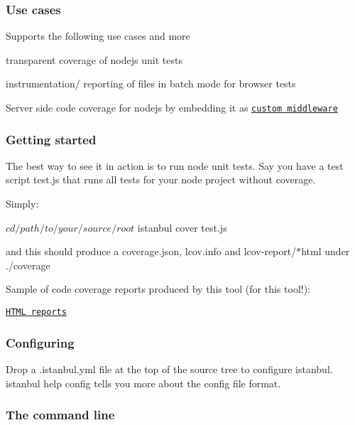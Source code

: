 \subsubsection*{Use cases}

Supports the following use cases and more


\begin{DoxyItemize}
\item transparent coverage of nodejs unit tests
\item instrumentation/ reporting of files in batch mode for browser tests
\item Server side code coverage for nodejs by embedding it as \href{https://github.com/gotwarlost/istanbul-middleware}{\tt custom middleware}
\end{DoxyItemize}

\subsubsection*{Getting started}



The best way to see it in action is to run node unit tests. Say you have a test script {\ttfamily test.\+js} that runs all tests for your node project without coverage.

Simply\+: \begin{DoxyVerb}$ cd /path/to/your/source/root
$ istanbul cover test.js
\end{DoxyVerb}


and this should produce a {\ttfamily coverage.\+json}, {\ttfamily lcov.\+info} and {\ttfamily lcov-\/report/$\ast$html} under {\ttfamily ./coverage}

Sample of code coverage reports produced by this tool (for this tool!)\+:

\href{http://gotwarlost.github.com/istanbul/public/coverage/lcov-report/index.html}{\tt H\+T\+M\+L reports}

\subsubsection*{Configuring}

Drop a {\ttfamily .istanbul.\+yml} file at the top of the source tree to configure istanbul. {\ttfamily istanbul help config} tells you more about the config file format.

\subsubsection*{The command line}

